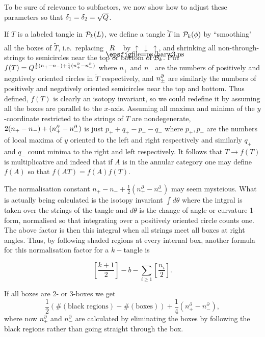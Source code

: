  To be sure of relevance to subfactors, we
now show how to adjust these parameters so that
$\delta_1=\delta_2=\sqrt{Q}$.

If $T$ is a labeled tangle in ${\cal P}_k(L)$, we define
a tangle $\tilde T$ in ${\cal P}_k(\phi)$ by ``smoothing" all the
boxes of $\tilde T$, i.e.~replacing $\boxe{R}$ by
$\uparrow \ \downarrow \ \uparrow$, and shrinking all
non-through-strings to semicircles near the top or bottom of ${\cal B}_k$. 
Put $f(T)=Q^{\frac 12(n_+-n_-)+\frac 14(n^\partial_+-n^\partial_-)}$
where $n_+$ and $n_-$ are the numbers of positively and negatively
oriented circles in $\tilde T$ respectively, and $n_{\pm}^\partial$ are
similarly the numbers of positively and negatively oriented
semicircles near the top and bottom.  Thus defined, $f(T)$ is
clearly an isotopy invariant, so we could redefine it by assuming
all the boxes are parallel to the $x$-axis. Assuming all maxima and
minima of the $y$-coordinate restricted to the strings of $T$ are
nondegenerate, $2(n_+-n_-)+(n^\partial_+-n^\partial_-)$ is just
$p_++q_+-p_--q_-$ where $p_+,p_-$ are the numbers of local maxima
of $y$ oriented to the left and right respectively and similarly
$q_+$ and $q_-$ count minima to the right and left respectively.
It follows that $T\to f(T)$ is multiplicative and indeed that if $A$
is in the annular category one may define $f(A)$ so that
$f(AT)=f(A)f(T)$.


The normalisation constant
$n_+-n_-+\frac{1}{2}(n_+^{\partial}-n_-^{\partial})$
may seem mysteious. What is actually being calculated is
the isotopy invariant $\int d\theta$
where the intgral is taken over the strings of the tangle
and $d\theta$ is the change of angle or curvature 1-form, normalised so that
integrating over a positively oriented circle counts one.
The above factor is then this integral when all strings meet
all boxes at right angles. Thus, by following shaded regions at every internal
box, another formula for this normalisation factor for a $k-$tangle is

\[
        [\frac{k+1}{2}]-b-\sum_{i\geq 1}[\frac{n_i}{2}].
\]

If all boxes are 2- or 3-boxes we get
\[
        \frac{1}{2}(\#(\mbox{black regions})-\#(\mbox{boxes}))+
        \frac{1}{4}(n_+^{\partial}-n_-^{\partial}),
\]
where now $n_+^{\partial}$ and $n_-^{\partial}$ are calculated
by eliminating the boxes by following the black regions rather
than going straight through the box.



